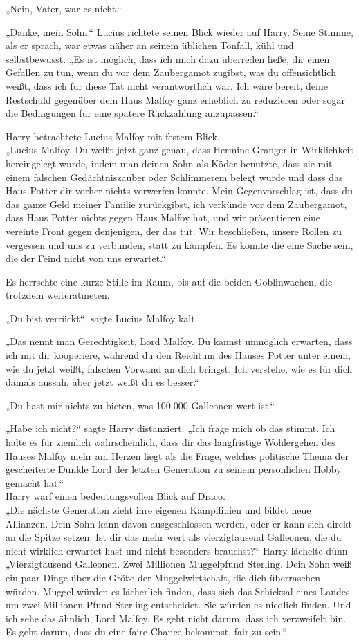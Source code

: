 {„Nein, Vater, war es nicht.“

„Danke, mein Sohn.“ Lucius richtete seinen Blick wieder auf Harry. Seine Stimme, als er sprach, war etwas näher an seinem üblichen Tonfall, kühl und selbstbewusst. „Es ist möglich, dass ich mich dazu überreden ließe, dir einen Gefallen zu tun, wenn du vor dem Zaubergamot zugibst, was du offensichtlich weißt, dass ich für diese Tat nicht verantwortlich war. Ich wäre bereit, deine Restschuld gegenüber dem Haus Malfoy ganz erheblich zu reduzieren oder sogar die Bedingungen für eine spätere Rückzahlung anzupassen.“

Harry betrachtete Lucius Malfoy mit festem Blick.\\ „Lucius Malfoy. Du weißt jetzt ganz genau, dass Hermine Granger in Wirklichkeit hereingelegt wurde, indem man deinen Sohn als Köder benutzte, dass sie mit einem falschen Gedächtniszauber oder Schlimmerem belegt wurde und dass das Haus Potter dir vorher nichts vorwerfen konnte. Mein Gegenvorschlag ist, dass du das ganze Geld meiner Familie zurückgibst, ich verkünde vor dem Zaubergamot, dass Haus Potter nichts gegen Haus Malfoy hat, und wir präsentieren eine vereinte Front gegen denjenigen, der das tut. Wir beschließen, unsere Rollen zu vergessen und uns zu verbünden, statt zu kämpfen. Es könnte die eine Sache sein, die der Feind nicht von uns erwartet.“

Es herrschte eine kurze Stille im Raum, bis auf die beiden Goblinwachen, die trotzdem weiteratmeten.

„Du bist verrückt“, sagte Lucius Malfoy kalt.

„Das nennt man Gerechtigkeit, Lord Malfoy. Du kannst unmöglich erwarten, dass ich mit dir kooperiere, während du den Reichtum des Hauses Potter unter einem, wie du jetzt weißt, falschen Vorwand an dich bringst. Ich verstehe, wie es für dich damals aussah, aber jetzt weißt du es besser.“

„Du hast mir nichts zu bieten, was 100.000 Galleonen wert ist.“

„Habe ich nicht?“ sagte Harry distanziert. „Ich frage mich ob das stimmt. Ich halte es für ziemlich wahrscheinlich, dass dir das langfristige Wohlergehen des Hauses Malfoy mehr am Herzen liegt als die Frage, welches politische Thema der gescheiterte Dunkle Lord der letzten Generation zu seinem persönlichen Hobby gemacht hat.“\\ Harry warf einen bedeutungsvollen Blick auf Draco.\\ „Die nächste Generation zieht ihre eigenen Kampflinien und bildet neue Allianzen. Dein Sohn kann davon ausgeschlossen werden, oder er kann sich direkt an die Spitze setzen. Ist dir das mehr wert als vierzigtausend Galleonen, die du nicht wirklich erwartet hast und nicht besonders brauchst?“ Harry lächelte dünn. „Vierzigtausend Galleonen. Zwei Millionen Muggelpfund Sterling. Dein Sohn weiß ein paar Dinge über die Größe der Muggelwirtschaft, die dich überraschen würden. Muggel würden es lächerlich finden, dass sich das Schicksal eines Landes um zwei Millionen Pfund Sterling entscheidet. Sie würden es niedlich finden. Und ich sehe das ähnlich, Lord Malfoy. Es geht nicht darum, dass ich verzweifelt bin. Es geht darum, dass du eine faire Chance bekommst, fair zu sein.“

}
